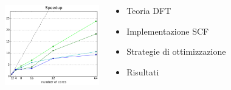 \documentclass[8pt]{beamer}
\begin{document}
\begin{frame}{}
\begin{columns}
		\begin{center}
			\includegraphics[height=3.5cm]{beam_first_slide.pdf}
		\end{center}
	\begin{block}{}
		\begin{itemize}
			\item Teoria DFT
			\item Implementazione SCF
			\item Strategie di ottimizzazione
			\item Risultati
		\end{itemize}
	\end{block}
\end{columns}
		
\end{frame}
\end{document}
